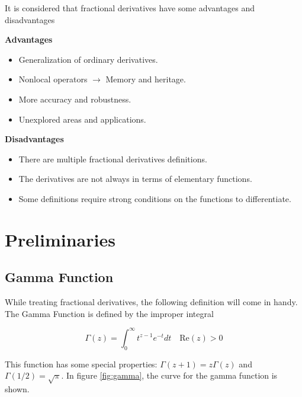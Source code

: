 It is considered that fractional derivatives have some advantages and disadvantages
\begin{multicols}{2}
    \textbf{Advantages}
    \begin{itemize}
        \item Generalization of ordinary derivatives.
        \item Nonlocal operators $\longrightarrow$ Memory and heritage.
        \item More accuracy and robustness.
        \item Unexplored areas and applications.
    \end{itemize}
    \columnbreak
    \textbf{Disadvantages}
    \begin{itemize}
        \item There are multiple fractional derivatives definitions.
        \item The derivatives are not always in terms of elementary functions.
        \item Some definitions require strong conditions on the functions to differentiate.
    \end{itemize}
    \end{multicols}

\section{Preliminaries}
\subsection{Gamma Function}\label{subsec:gamma}
While treating fractional derivatives, the following definition will come in handy. The Gamma Function is defined by the improper integral

\begin{equation}
    \Gamma(z) = \int_0^\infty t^{z-1}e^{-t}dt\quad \mathrm{Re}(z)>0
\end{equation}

This function has some special properties: $\Gamma(z+1)=z\Gamma(z)$ and $\Gamma(1/2)=\sqrt{\pi}$. In figure \ref{fig:gamma}, the curve for the gamma function is shown.

